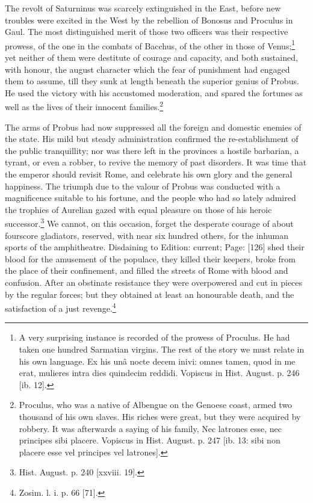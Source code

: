 The revolt of Saturninus was scarcely extinguished in the East, before new troubles were excited in the West by the rebellion of Bonosus and Proculus in Gaul. The most distinguished merit of those two officers was their respective prowess, of the one in the combats of Bacchus, of the other in those of Venus;\footnote{A very surprising instance is recorded of the prowess of Proculus. He had taken one hundred Sarmatian virgins. The rest of the story we must relate in his own language. Ex his unâ nocte decem inivi: omnes tamen, quod in me erat, mulieres intra dies quindecim reddidi. Vopiscus in Hist. August. p. 246 [ib. 12].} yet neither of them were destitute of courage and capacity, and both sustained, with honour, the august character which the fear of punishment had engaged them to assume, till they sunk at length beneath the superior genius of Probus. He used the victory with his accustomed moderation, and spared the fortunes as well as the lives of their innocent families.\footnote{Proculus, who was a native of Albengue on the Genoese coast, armed two thousand of his own slaves. His riches were great, but they were acquired by robbery. It was afterwards a saying of his family, Nec latrones esse, nec principes sibi placere. Vopiscus in Hist. August. p. 247 [ib. 13: sibi non placere esse vel principes vel latrones].}

The arms of Probus had now suppressed all the foreign and domestic enemies of the state. His mild but steady administration confirmed the re-establishment of the public tranquillity; nor was there left in the provinces a hostile barbarian, a tyrant, or even a robber, to revive the memory of past disorders. It was time that the emperor should revisit Rome, and celebrate his own glory and the general happiness. The triumph due to the valour of Probus was conducted with a magnificence suitable to his fortune, and the people who had so lately admired the trophies of Aurelian gazed with equal pleasure on those of his heroic successor.\footnote{Hist. August. p. 240 [xxviii. 19].} We cannot, on this occasion, forget the desperate courage of about fourscore gladiators, reserved, with near six hundred others, for the inhuman sports of the amphitheatre. Disdaining to Edition: current; Page: [126] shed their blood for the amusement of the populace, they killed their keepers, broke from the place of their confinement, and filled the streets of Rome with blood and confusion. After an obstinate resistance they were overpowered and cut in pieces by the regular forces; but they obtained at least an honourable death, and the satisfaction of a just revenge.\footnote{Zosim. l. i. p. 66 [71].}

